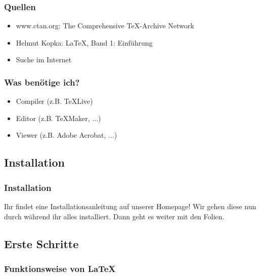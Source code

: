 \begin{frame}
\frametitle{Quellen}
\begin{itemize}[<+->]
  \item www.ctan.org: The Comprehensive \TeX-Archive Network
  \item Helmut Kopka: \LaTeX, Band 1: Einführung
  \item Suche im Internet
\end{itemize}
\end{frame}

\begin{frame}
\frametitle{Was benötige ich?}
\begin{itemize}[<+->]
\item Compiler (z.B. TeXLive)
\item Editor (z.B. TeXMaker, ...)
\item Viewer (z.B. Adobe Acrobat, ...)
\end{itemize}
\end{frame}


\subsection{Installation}

\begin{frame}
\frametitle{Installation}
Ihr findet eine Installationsanleitung auf unserer Homepage! Wir gehen diese nun durch während ihr alles installiert. Dann geht es weiter mit den Folien.

\end{frame}

\subsection{Erste Schritte}


\begin{frame}
\frametitle{Funktionsweise von \LaTeX}
\begin{center}
\end{center}
\end{frame}

